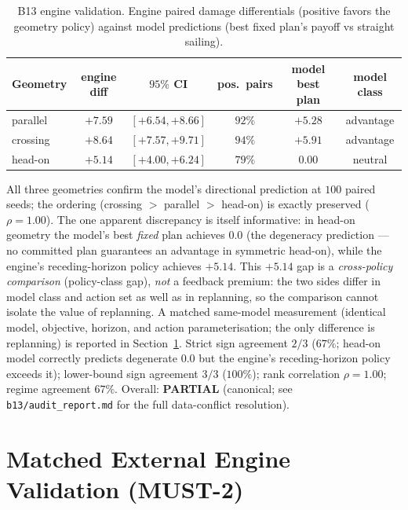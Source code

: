 \documentclass[12pt,a4paper]{article}
\begin{document}
\begin{table}[!htb]
\centering\small
\caption{B13 engine validation.  Engine paired damage differentials
(positive favors the geometry policy) against model predictions (best
fixed plan's payoff vs straight sailing).}
\label{tab:b13}
\begin{tabular}{lccccc}
\toprule
Geometry & engine diff & $95\%$ CI & pos.\ pairs & model best plan & model class \\
\midrule
parallel & $+7.59$ & $[+6.54,+8.66]$ & $92\%$ & $+5.28$ & advantage \\
crossing & $+8.64$ & $[+7.57,+9.71]$ & $94\%$ & $+5.91$ & advantage \\
head-on & $+5.14$ & $[+4.00,+6.24]$ & $79\%$ & $0.00$ & neutral \\
\bottomrule
\end{tabular}
\end{table}

All three geometries confirm the model's directional prediction at
$100$ paired seeds; the ordering (crossing $>$ parallel $>$ head-on) is
exactly preserved ($\rho=1.00$).  The one apparent discrepancy is itself
informative: in head-on geometry the model's best \emph{fixed} plan
achieves $0.0$ (the degeneracy prediction --- no committed plan guarantees
an advantage in symmetric head-on), while the engine's receding-horizon
policy achieves $+5.14$.  This $+5.14$ gap is a \emph{cross-policy
comparison} (policy-class gap), \emph{not} a feedback premium: the two
sides differ in model class and action set as well as in replanning, so
the comparison cannot isolate the value of replanning.  A matched
same-model measurement (identical model, objective, horizon, and action
parameterisation; the only difference is replanning) is reported in
Section~\ref{sec:matched}.
Strict sign agreement $2/3$ ($67\%$; head-on model correctly predicts
degenerate $0.0$ but the engine's receding-horizon policy exceeds it);
lower-bound sign agreement $3/3$ ($100\%$); rank correlation $\rho=1.00$;
regime agreement $67\%$.  Overall: \textbf{PARTIAL} (canonical; see
\texttt{b13/audit\_report.md} for the full data-conflict resolution).

\section{Matched External Engine Validation (MUST-2)}\label{sec:matched}
\end{document}

